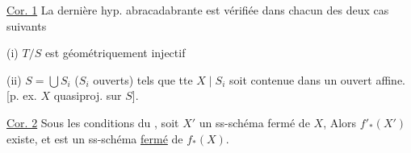 
\uline{Cor. 1} La dernière hyp. abracadabrante est vérifiée dans chacun des deux cas suivants

(i) $T/S$ est géométriquement injectif

(ii) $S=\bigcup S_i$ ($S_i$ ouverts) tels que tte  $X\mid S_i$ soit contenue dans un ouvert affine. [p. ex. $X$ quasiproj. sur $S$].

\uline{Cor. 2} Sous les conditions du , soit $X'$ un ss-schéma fermé de $X$,  Alors $f'_*(X')$ existe, et est un ss-schéma \uline{fermé} de $f_*(X)$.


